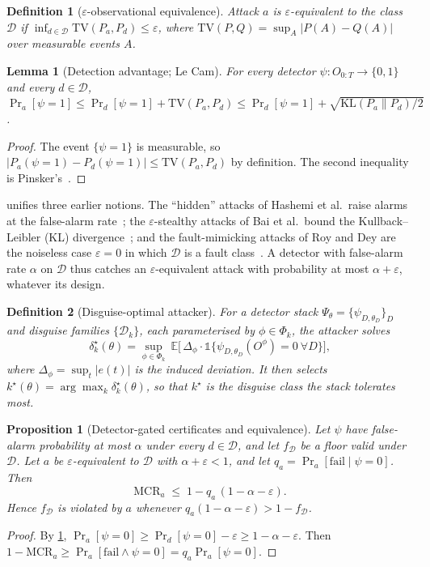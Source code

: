 \documentclass[letterpaper,twocolumn,10pt]{article}
\newcommand{\TV}{\mathrm{TV}}
\newcommand{\KL}{\mathrm{KL}}
\newcommand{\MCR}{\mathrm{MCR}}
\newcommand{\E}{\mathbb{E}}
\newcommand{\Dclass}{\mathcal{D}}
\newtheorem{definition}{Definition}
\newtheorem{lemma}{Lemma}
\newtheorem{proposition}{Proposition}
\theoremstyle{remark}
\begin{document}
\begin{definition}[$\varepsilon$-observational equivalence]
\label{def:equiv}
Attack $a$ is $\varepsilon$-equivalent to the class $\Dclass$ if
$\inf_{d\in\Dclass}\TV(P_a,P_d)\le\varepsilon$, where
$\TV(P,Q)=\sup_A|P(A)-Q(A)|$ over measurable events $A$.
\end{definition}

\begin{lemma}[Detection advantage; Le Cam]
\label{lem:lecam}
For every detector $\psi:O_{0:T}\to\{0,1\}$ and every $d\in\Dclass$,
$\Pr_a[\psi=1]\le\Pr_d[\psi=1]+\TV(P_a,P_d)\le\Pr_d[\psi=1]+\sqrt{\KL(P_a\|P_d)/2}$.
\end{lemma}
\begin{proof}
The event $\{\psi=1\}$ is measurable, so $|P_a(\psi=1)-P_d(\psi=1)|\le\TV(P_a,P_d)$
by definition. The second inequality is Pinsker's~\cite{tsybakov2009}.
\end{proof}

\noindent
{} unifies three earlier notions. The ``hidden'' attacks of Hashemi
et al.\ raise alarms at the false-alarm rate~\cite{hashemi2018}; the
$\varepsilon$-stealthy attacks of Bai et al.\ bound the Kullback--Leibler (KL)
divergence~\cite{bai2017}; and the fault-mimicking attacks of Roy and Dey are the
noiseless case $\varepsilon=0$ in which $\Dclass$ is a fault class~\cite{roy2023}.
A detector with false-alarm rate $\alpha$ on $\Dclass$ thus catches an
$\varepsilon$-equivalent attack with probability at most $\alpha+\varepsilon$,
whatever its design.

\begin{definition}[Disguise-optimal attacker]
\label{def:disguise}
For a detector stack $\Psi_\theta=\{\psi_{D,\theta_D}\}_D$ and disguise families
$\{\Dclass_k\}$, each parameterised by $\phi\in\Phi_k$, the attacker solves
\begin{equation}
\label{eq:attacker}
\delta^\star_k(\theta)=\sup_{\phi\in\Phi_k}\ \E\big[\,\Delta_\phi\cdot
\mathbb 1\{\psi_{D,\theta_D}(O^\phi)=0\ \forall D\}\big],
\end{equation}
where $\Delta_\phi=\sup_t|e(t)|$ is the induced deviation. It then selects
$k^\star(\theta)=\arg\max_k\delta^\star_k(\theta)$, so that $k^\star$ is the
disguise class the stack tolerates most.
\end{definition}

\begin{proposition}[Detector-gated certificates and equivalence]
\label{prop:gated}
Let $\psi$ have false-alarm probability at most $\alpha$ under every
$d\in\Dclass$, and let $f_\Dclass$ be a floor valid under $\Dclass$. Let $a$ be
$\varepsilon$-equivalent to $\Dclass$ with $\alpha+\varepsilon<1$, and let
$q_a=\Pr_a[\text{fail}\mid\psi=0]$. Then
\[
\MCR_a\;\le\;1-q_a\,(1-\alpha-\varepsilon).
\]
Hence $f_\Dclass$ is violated by $a$ whenever
$q_a(1-\alpha-\varepsilon)>1-f_\Dclass$.
\end{proposition}
\begin{proof}
By \cref{lem:lecam}, $\Pr_a[\psi=0]\ge\Pr_d[\psi=0]-\varepsilon\ge1-\alpha-\varepsilon$.
Then $1-\MCR_a\ge\Pr_a[\text{fail}\wedge\psi=0]=q_a\Pr_a[\psi=0]$.
\end{proof}
\end{document}
